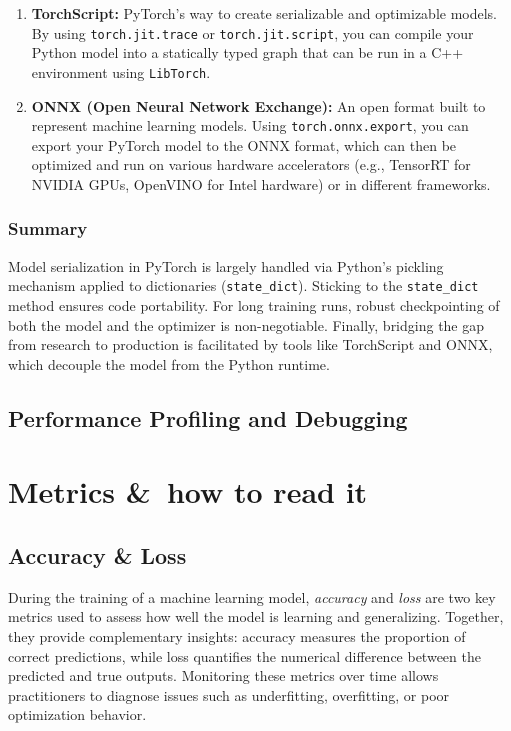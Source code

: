 \documentclass[12pt,a4paper]{report}
\begin{document}
\begin{enumerate}
    \item \textbf{TorchScript:} PyTorch's way to create serializable and optimizable models. By using \texttt{torch.jit.trace} or \texttt{torch.jit.script}, you can compile your Python model into a statically typed graph that can be run in a C++ environment using \texttt{LibTorch}.
    \item \textbf{ONNX (Open Neural Network Exchange):} An open format built to represent machine learning models. Using \texttt{torch.onnx.export}, you can export your PyTorch model to the ONNX format, which can then be optimized and run on various hardware accelerators (e.g., TensorRT for NVIDIA GPUs, OpenVINO for Intel hardware) or in different frameworks.
\end{enumerate}

\subsection{Summary}
Model serialization in PyTorch is largely handled via Python's pickling mechanism applied to dictionaries (\texttt{state\_dict}). Sticking to the \texttt{state\_dict} method ensures code portability. For long training runs, robust checkpointing of both the model and the optimizer is non-negotiable. Finally, bridging the gap from research to production is facilitated by tools like TorchScript and ONNX, which decouple the model from the Python runtime.

\section{Performance Profiling and Debugging}

\chapter{Metrics \&\ how to read it}

\section{Accuracy \& Loss}

During the training of a machine learning model, \textit{accuracy} and \textit{loss} are two key metrics used to assess how well the model is learning and generalizing. 
Together, they provide complementary insights: accuracy measures the proportion of correct predictions, while loss quantifies the numerical difference between the predicted and true outputs. 
Monitoring these metrics over time allows practitioners to diagnose issues such as underfitting, overfitting, or poor optimization behavior.
\end{document}
